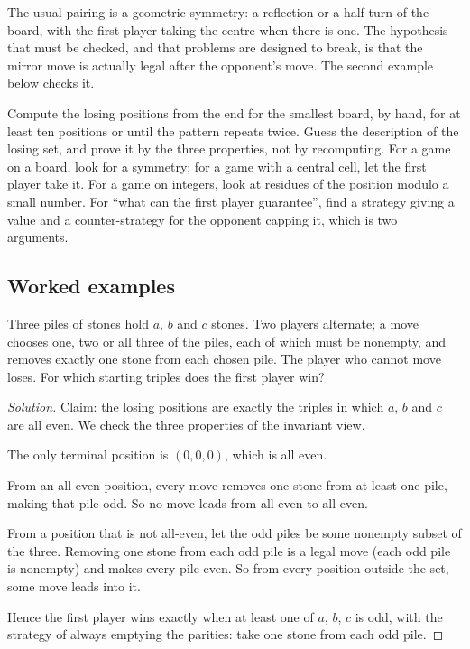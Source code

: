 The usual pairing is a geometric symmetry: a reflection or a half-turn of the board, with the first player taking the centre when there is one. The hypothesis that must be checked, and that problems are designed to break, is that the mirror move is actually legal after the opponent's move. The second example below checks it.

\begin{firstmoves}
Compute the losing positions from the end for the smallest board, by hand, for at least ten positions or until the pattern repeats twice. Guess the description of the losing set, and prove it by the three properties, not by recomputing. For a game on a board, look for a symmetry; for a game with a central cell, let the first player take it. For a game on integers, look at residues of the position modulo a small number. For ``what can the first player guarantee'', find a strategy giving a value and a counter-strategy for the opponent capping it, which is two arguments.
\end{firstmoves}

\subsection*{Worked examples}

\begin{example}
Three piles of stones hold $a$, $b$ and $c$ stones. Two players alternate; a move chooses one, two or all three of the piles, each of which must be nonempty, and removes exactly one stone from each chosen pile. The player who cannot move loses. For which starting triples does the first player win?
\end{example}

\begin{proof}[Solution]
Claim: the losing positions are exactly the triples in which $a$, $b$ and $c$ are all even. We check the three properties of the invariant view.

The only terminal position is $(0, 0, 0)$, which is all even.

From an all-even position, every move removes one stone from at least one pile, making that pile odd. So no move leads from all-even to all-even.

From a position that is not all-even, let the odd piles be some nonempty subset of the three. Removing one stone from each odd pile is a legal move (each odd pile is nonempty) and makes every pile even. So from every position outside the set, some move leads into it.

Hence the first player wins exactly when at least one of $a$, $b$, $c$ is odd, with the strategy of always emptying the parities: take one stone from each odd pile.
\end{proof}

